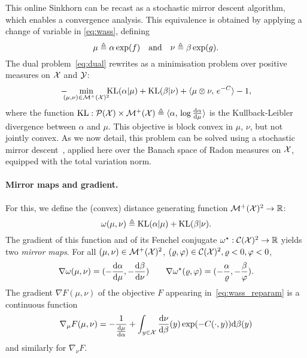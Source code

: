 This online Sinkhorn can be recast as a stochastic mirror descent algorithm, which enables a convergence analysis.
%
This equivalence is obtained by applying a change
of variable in \eqref{eq:wass}, defining 
\begin{equation}\label{eq-change-var}
	\mu \triangleq \alpha \exp(f)
	\quad \text{and} \quad 
	\nu \triangleq \beta \exp(g). 
\end{equation}
The dual problem~\eqref{eq:dual} 
rewrites as a minimisation problem over positive measures on $\mathcal{X}$ and $\mathcal{Y}$:
\begin{equation}\label{eq:wass_reparam}
    - \!\!\!\!\min_{(\mu,\nu) \in \mathcal{M}^+(\mathcal{X})^2} \!\!\!\textrm{KL}(\alpha | \mu)
    + \textrm{KL}(\beta | \nu) + \langle \mu \otimes \nu,\,e^{-C}\rangle - 1,
\end{equation}
where the function $\textrm{KL}: \mathcal{P}(\mathcal{X}) \times \mathcal{M}^+(\mathcal{X}) \triangleq \langle \alpha,\, \log \frac{\textrm{d} \alpha}{\textrm{d} \mu}\rangle$ is the Kullback-Leibler divergence between
$\alpha$ and $\mu$. 
%
This objective is block convex in $\mu$, $\nu$, but not jointly convex. 
%
As we now detail, this problem can be solved using a stochastic mirror descent~\citep{beck2003mirror}, applied here over the Banach space of Radon measures on $\mathcal{X}$, equipped with the total variation norm. 

\paragraph{Mirror maps and gradient.}

For this, we define the (convex) distance generating function $\mathcal{M}^+(\mathcal{X})^2 \to \mathbb{R}$:
\begin{equation}
    \omega(\mu, \nu) \triangleq \textrm{KL}(\alpha | \mu) + \textrm{KL}(\beta | \nu).
\end{equation}
The gradient of this function and of its Fenchel conjugate $\omega^\star:
\mathcal{C}(\mathcal{X})^2 \to \mathbb{R}$ yields two \textit{mirror maps}. For all $(\mu, \nu) \in
\mathcal{M}^+(\mathcal{X})^2$, $(\varrho, \varphi) \in \mathcal{C}(\mathcal{X})^2, \varrho < 0, \varphi < 0$,
\begin{equation}
    \nabla \omega(\mu, \nu) = (- \frac{\textrm{d} \alpha}{\textrm{d} \mu}, - \frac{\textrm{d} \beta}{\textrm{d} \nu} )
    \qquad \nabla \omega^\star(\varrho, \varphi)
     = (-\frac{\alpha}{\varrho}, -\frac{\beta}{\varphi}).
\end{equation}
The gradient $\nabla F(\mu, \nu)$ of the objective $F$ appearing
in~\eqref{eq:wass_reparam} is a continuous function
\begin{equation}
    \nabla_\mu F(\mu, \nu) = - \frac{1}{\frac{\textrm{d}\mu}{\textrm{d}\alpha}} + \int_{y \in \mathcal{X}}
    \frac{\textrm{d} \nu}{\textrm{d} \beta}(y) \exp(- C(\cdot, y)) \textrm{d} \beta(y)
\end{equation}
and similarly for $\nabla_\nu F$.

